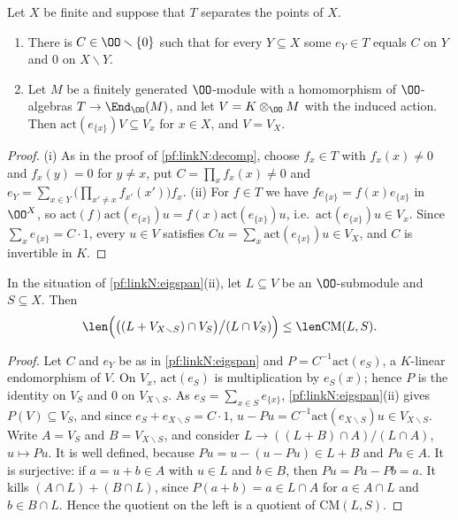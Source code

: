 \begin{lemma}\label{pf:linkN:eigspan}
Let $X$ be finite and suppose that $T$ separates the points of $X$.
\begin{enumerate}[label=(\roman*)]
\item There is $C\in\OO\smallsetminus\{0\}$ such that for every $Y\subseteq X$ some $e_Y\in T$ equals $C$ on $Y$ and $0$ on
$X\smallsetminus Y$.
\item Let $M$ be a finitely generated $\OO$-module with a homomorphism of $\OO$-algebras $T\to\End_\OO(M)$, and let $V=K\otimes_\OO M$
with the induced action. Then $\mathrm{act}(e_{\{x\}})V\subseteq V_x$ for $x\in X$, and $V=V_X$.
\end{enumerate}
\end{lemma}

\begin{proof}
(i) As in the proof of \cref{pf:linkN:decomp}, choose $f_x\in T$ with $f_x(x)\ne0$ and $f_x(y)=0$ for $y\ne x$, put
$C=\prod_xf_x(x)\ne0$ and $e_Y=\sum_{x\in Y}\bigl(\prod_{x'\ne x}f_{x'}(x')\bigr)f_x$.
(ii) For $f\in T$ we have $fe_{\{x\}}=f(x)e_{\{x\}}$ in $\OO^X$, so $\mathrm{act}(f)\mathrm{act}(e_{\{x\}})u=f(x)\mathrm{act}(e_{\{x\}})u$,
i.e.\ $\mathrm{act}(e_{\{x\}})u\in V_x$. Since $\sum_xe_{\{x\}}=C\cdot1$, every $u\in V$ satisfies $Cu=\sum_x\mathrm{act}(e_{\{x\}})u\in V_X$,
and $C$ is invertible in $K$.
\end{proof}

\begin{lemma}\label{pf:linkN:projcm}
In the situation of \cref{pf:linkN:eigspan}(ii), let $L\subseteq V$ be an $\OO$-submodule and $S\subseteq X$. Then
\[
\len\Bigl(\bigl((L+V_{X\smallsetminus S})\cap V_S\bigr)\big/(L\cap V_S)\Bigr)\le\len\mathrm{CM}(L,S).
\]
\end{lemma}

\begin{proof}
Let $C$ and $e_Y$ be as in \cref{pf:linkN:eigspan} and $P=C^{-1}\mathrm{act}(e_S)$, a $K$-linear endomorphism of $V$. On $V_x$,
$\mathrm{act}(e_S)$ is multiplication by $e_S(x)$; hence $P$ is the identity on $V_S$ and $0$ on $V_{X\smallsetminus S}$. As
$e_S=\sum_{x\in S}e_{\{x\}}$, \cref{pf:linkN:eigspan}(ii) gives $P(V)\subseteq V_S$, and since $e_S+e_{X\smallsetminus S}=C\cdot1$,
$u-Pu=C^{-1}\mathrm{act}(e_{X\smallsetminus S})u\in V_{X\smallsetminus S}$. Write $A=V_S$ and $B=V_{X\smallsetminus S}$, and consider
$L\to((L+B)\cap A)/(L\cap A)$, $u\mapsto Pu$. It is well defined, because $Pu=u-(u-Pu)\in L+B$ and $Pu\in A$. It is surjective: if
$a=u+b\in A$ with $u\in L$ and $b\in B$, then $Pu=Pa-Pb=a$. It kills $(A\cap L)+(B\cap L)$, since $P(a+b)=a\in L\cap A$ for $a\in A\cap L$
and $b\in B\cap L$. Hence the quotient on the left is a quotient of $\mathrm{CM}(L,S)$.
\end{proof}

